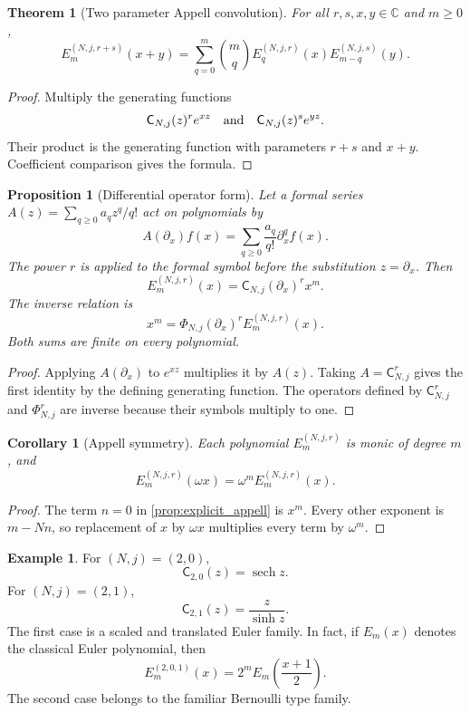 \documentclass{aomart}
\newtheorem{theorem}{Theorem}[section]
\newtheorem{proposition}[proposition]{Proposition}
\newtheorem{corollary}[corollary]{Corollary}
\theoremstyle{definition}
\newtheorem{example}[example]{Example}
\theoremstyle{remark}
\newcommand{\CC}{\mathbb C}
\newcommand{\Cfun}{\mathsf C}
\newcommand{\sech}{\operatorname{sech}}
\begin{document}
\begin{theorem}[Two parameter Appell convolution]\label{thm:appell_two_parameter_convolution}
For all $r,s,x,y\in\CC$ and $m\geq0$,
\[
E_m^{(N,j,r+s)}(x+y)
=
\sum_{q=0}^{m}
\binom mq
E_q^{(N,j,r)}(x)
E_{m-q}^{(N,j,s)}(y).
\]
\end{theorem}

\begin{proof}
Multiply the generating functions
\[
\Cfun_{N,j}(z)^re^{xz}
\quad\hbox{and}\quad
\Cfun_{N,j}(z)^se^{yz}.
\]
Their product is the generating function with parameters $r+s$ and $x+y$.  Coefficient comparison gives the formula.
\end{proof}

\begin{proposition}[Differential operator form]\label{prop:appell_operator_form}
Let a formal series $A(z)=\sum_{q\geq0}a_qz^q/q!$ act on polynomials by
\[
A(\partial_x)f(x)
=
\sum_{q\geq0}\frac{a_q}{q!}\partial_x^qf(x).
\]
The power $r$ is applied to the formal symbol before the substitution $z=\partial_x$.  Then
\[
E_m^{(N,j,r)}(x)
=
\Cfun_{N,j}(\partial_x)^r x^m.
\]
The inverse relation is
\[
x^m
=
\Phi_{N,j}(\partial_x)^r
E_m^{(N,j,r)}(x).
\]
Both sums are finite on every polynomial.
\end{proposition}

\begin{proof}
Applying $A(\partial_x)$ to $e^{xz}$ multiplies it by $A(z)$.  Taking $A=\Cfun_{N,j}^r$ gives the first identity by the defining generating function.  The operators defined by $\Cfun_{N,j}^r$ and $\Phi_{N,j}^r$ are inverse because their symbols multiply to one.
\end{proof}


\begin{corollary}[Appell symmetry]\label{cor:appell_symmetry}
Each polynomial $E_m^{(N,j,r)}$ is monic of degree $m$, and
\[
E_m^{(N,j,r)}(\omega x)
=
\omega^mE_m^{(N,j,r)}(x).
\]
\end{corollary}

\begin{proof}
The term $n=0$ in \cref{prop:explicit_appell} is $x^m$.  Every other exponent is $m-Nn$, so replacement of $x$ by $\omega x$ multiplies every term by $\omega^m$.
\end{proof}

\begin{example}\label{ex:euler_boundaries}
For $(N,j)=(2,0)$,
\[
\Cfun_{2,0}(z)=\sech z.
\]
For $(N,j)=(2,1)$,
\[
\Cfun_{2,1}(z)=\frac z{\sinh z}.
\]
The first case is a scaled and translated Euler family.  In fact, if $E_m(x)$ denotes the classical Euler polynomial, then
\[
E_m^{(2,0,1)}(x)
=
2^mE_m\left(\frac{x+1}{2}\right).
\]
The second case belongs to the familiar Bernoulli type family.
\end{example}
\end{document}
